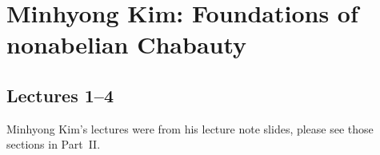 \newpage
\section{Minhyong Kim: Foundations of nonabelian Chabauty}
\subsection{Lectures 1--4}

Minhyong Kim's lectures were from his lecture note slides, please see those sections in Part~II. 